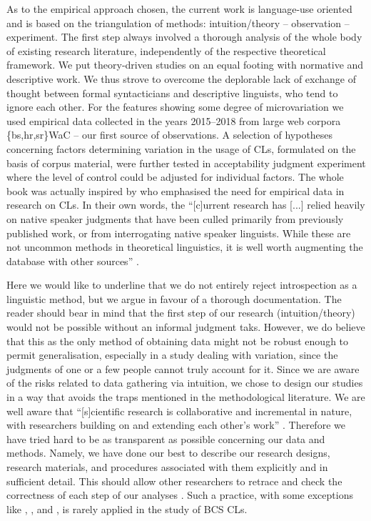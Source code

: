 As to the empirical approach chosen, the current work is language-use oriented and is based on the triangulation of methods: intuition/theory – observation – experiment. The first step always involved a thorough analysis of the whole body of existing research literature, independently of the respective theoretical framework. We put theory-driven studies on an equal footing with normative and descriptive work. We thus strove to overcome the deplorable lack of exchange of thought between formal syntacticians and descriptive linguists, who tend to ignore each other. For the features showing some degree of microvariation we used empirical data collected in the years 2015--2018 from large web corpora \{bs,hr,sr\}WaC – our first source of observations. A selection of hypotheses concerning factors determining variation in the usage of CLs, formulated on the basis of corpus material, were further tested in acceptability judgment experiment where the level of control could be adjusted for individual factors. The whole book was actually inspired by \citet[60]{DFZ09} who emphasised the need for empirical data in research on CLs. In their own words, the ``[c]urrent research has [...] relied heavily on native speaker judgments that have been culled primarily from previously published work, or from interrogating native speaker linguists. While these are not uncommon methods in theoretical linguistics, it is well worth augmenting the database with other sources'' \citep[60]{DFZ09}.

Here we would like to underline that we do not entirely reject introspection as a linguistic method, but we argue in favour of a thorough documentation. The reader should bear in mind that the first step of our research (intuition/theory) would not be possible without an informal judgment taks. However, we do believe that this as the only method of obtaining data might not be robust enough to permit generalisation, especially in a study dealing with variation, since the judgments of one or a few people cannot truly account for it. Since we are aware of the risks related to data gathering via intuition, we chose to design our studies in a way that avoids the traps mentioned in the methodological literature.
We are well aware that ``[s]cientific research is collaborative and incremental in nature, with researchers building on and extending each other’s work'' \citep[133f]{Stefanowitsch20}. Therefore we have tried hard to be as transparent as possible concerning our data and methods. Namely, we have done our best to describe our research designs, research materials, and procedures associated with them explicitly and in sufficient detail. This should allow other researchers to retrace and check the correctness of each step of our analyses \citep[cf.][133f]{Stefanowitsch20}. Such a practice, with some exceptions like \citet{DFZ09}, \citet{ZFD17}, and \citet{DiesingZec17}, is rarely applied in the study of BCS CLs.

